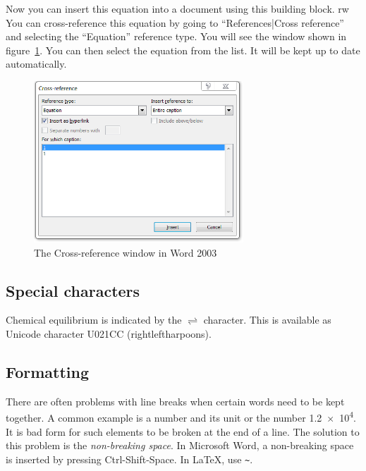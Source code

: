 \documentclass[a5paper, 10pt]{article}
\begin{document}
Now you can insert this equation into a document using this building block.
rw
You can cross-reference this equation by going to ``References|Cross reference'' and selecting the ``Equation'' reference type. 
You will see the window shown in figure~\ref{fig:wordcrossref}. 
You can then select the equation from the list. 
It will be kept up to date automatically.
\begin{figure}[htbp]
  \centering
  \includegraphics[width=0.7\textwidth]{crossreference}
  \caption{The Cross-reference window in Word 2003}
  \label{fig:wordcrossref}
\end{figure}

\subsection{Special characters}
Chemical equilibrium is indicated by the $\rightleftharpoons$
character.  This is available as Unicode character U021CC
(rightleftharpoons).

\subsection{Formatting}
\label{sec:tips-formatting}
There are often problems with line breaks when certain words need to
be kept together.  A common example is a number and its unit or the
number \num{1.2e4}.  It is bad form for such elements to be broken at
the end of a line.  The solution to this problem is the
\emph{non-breaking space}.  In Microsoft Word, a non-breaking space is
inserted by pressing Ctrl-Shift-Space.  In \LaTeX, use \verb|~|.


\end{document}
